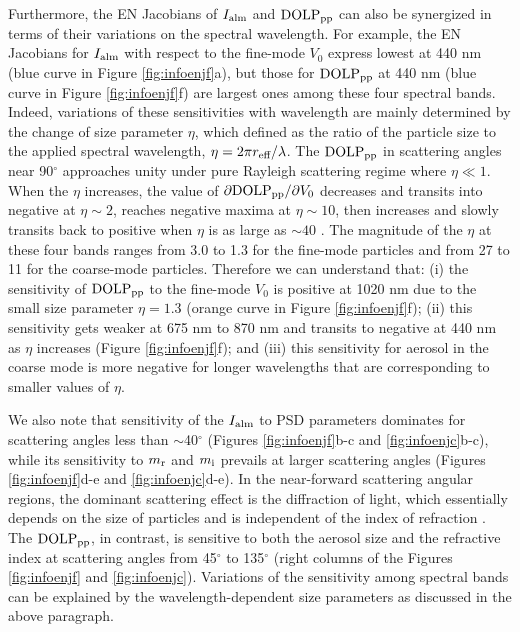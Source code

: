 Furthermore, the EN Jacobians of $I_\text{alm}$ and $\text{DOLP}_\text{pp}$ can also be synergized 
in terms of their variations on the spectral wavelength. For example, the EN
Jacobians for $I_\text{alm}$ with respect to the fine-mode $V_0$ express lowest at 
440 nm (blue curve in Figure \ref{fig:infoenjf}a), but those for $\text{DOLP}_\text{pp}$ at 
440 nm (blue curve in Figure \ref{fig:infoenjf}f) are largest ones among these
four spectral bands. Indeed, variations of these sensitivities with wavelength
are mainly determined by the change of size parameter $\eta$, which defined 
as the ratio of the particle size to the applied spectral wavelength, 
$\eta=2\pi r_\text{eff}/\lambda$. The $\text{DOLP}_\text{pp}$ in scattering angles near 90$^\circ$
approaches unity under pure Rayleigh scattering regime where $\eta \ll 1$. 
When the  $\eta$ increases, the value of $\partial\text{DOLP}_\text{pp}/\partial{V_0}$ 
decreases and transits into negative at $\eta \sim 2$, reaches negative 
maxima at $\eta \sim 10$, then increases and slowly transits back to positive
when $\eta$ is as large as $\sim 40$ \citep{Hansen74}. The magnitude of the 
$\eta$ at these four bands ranges from 3.0 to 1.3 for the fine-mode particles 
and from 27 to 11 for the coarse-mode particles. Therefore we can understand 
that: (i) the sensitivity of $\text{DOLP}_\text{pp}$ to the fine-mode $V_0$ is
positive at 1020 nm due to the small size parameter $\eta=1.3$ (orange curve 
in Figure \ref{fig:infoenjf}f); (ii) this sensitivity gets weaker at 675 nm to
 870 nm and transits to negative at 440 nm as $\eta$ increases 
(Figure \ref{fig:infoenjf}f); and (iii) this sensitivity for aerosol in the 
coarse mode is more negative for longer wavelengths that are
corresponding to smaller values of $\eta$. 

We also note that sensitivity of the $I_\text{alm}$ to PSD parameters dominates for
scattering angles less than $\sim$40$^\circ$ (Figures \ref{fig:infoenjf}b-c and 
\ref{fig:infoenjc}b-c), while its sensitivity to $m_\text{r}$ and $m_\text{i}$ 
prevails at larger scattering angles (Figures \ref{fig:infoenjf}d-e and
\ref{fig:infoenjc}d-e). In the near-forward scattering angular regions, the 
dominant scattering effect is the diffraction of light, which essentially 
depends on the size of particles and is independent of the index of refraction
\citep{vandeHulst81, Hansen74}. The $\text{DOLP}_\text{pp}$, in contrast, is sensitive to both
the aerosol size and the refractive index at scattering angles from 45$^\circ$ 
to 135$^\circ$ (right columns of the Figures \ref{fig:infoenjf} and
\ref{fig:infoenjc}). Variations of the sensitivity among spectral bands can be
explained by the wavelength-dependent size parameters as discussed in the above
paragraph.  

